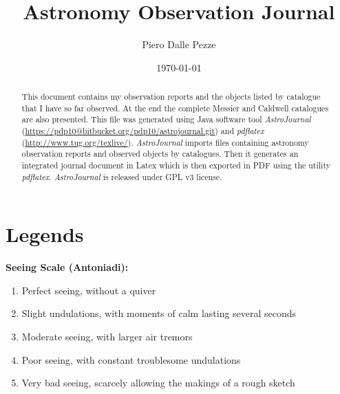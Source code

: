 \documentclass[10pt,twoside,a4paper,english]{article}
\title{Astronomy Observation Journal}
\author{Piero Dalle Pezze}
\date{\today}
\begin{document}
\maketitle

\begin{abstract}
This document contains my observation reports and the objects listed by catalogue that I have so far observed. At the end the complete Messier and Caldwell catalogues are also presented. This file was generated using Java software tool {\it AstroJournal} (\href{https://pdp10@bitbucket.org/pdp10/astrojournal.git}{https://pdp10@bitbucket.org/pdp10/astrojournal.git}) and {\it pdflatex} (\href{http://www.tug.org/texlive/}{http://www.tug.org/texlive/}). {\it AstroJournal} imports files containing astronomy observation reports and observed objects by catalogues. Then it generates an integrated journal document in Latex which is then exported in PDF using the utility {\it pdflatex}. {\it AstroJournal} is released under GPL v3 license.
\end{abstract}

\tableofcontents

\newpage


\small


\section{Legends}

\noindent 

\bigskip 
{\bf Seeing Scale (Antoniadi):}
\begin{enumerate}
\item Perfect seeing, without a quiver
\item Slight undulations, with moments of calm lasting several seconds
\item Moderate seeing, with larger air tremors
\item Poor seeing, with constant troublesome undulations
\item Very bad seeing, scarcely allowing the makings of a rough sketch
\end{enumerate}
\end{document}
